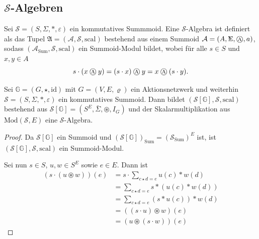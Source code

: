 \documentclass{article}
\DeclareMathOperator*{\Sigmacirc}{%
  \ThisStyle{\mathop{\ensurestackMath{\stackinset{c}{-0.75\LMpt}{c}{}{%
  \rotatebox[origin=lb]{-90}{$\circ$}}{\SavedStyle\Sigma}}}}}
\newcommand{\algebra}{\mathbin{
  \mathchoice
    {\mbox{\normalsize\textcircled{\scriptsize A}}}
    {\mbox{\normalsize\textcircled{\scriptsize A}}}
    {\mbox{\scriptsize\textcircled{\tiny A}}}
    {\mbox{\tiny\textcircled{\fontsize{3.5}{3.5}\selectfont A}}}
  }
}
\begin{document}
\subsection{$\mathcal{S}$-Algebren}

\begin{definition}
  Sei $\mathcal{S} = (S, \Sigma, \ast, \varepsilon)$ ein kommutatives Summmoid.
  Eine $\mathcal{S}$-Algebra ist definiert als das Tupel $\mathfrak{A} = (\mathcal{A}, \mathcal{S}, \text{scal})$
  bestehend aus einem Summoid $\mathcal{A} = (A, \Sigmacirc, \algebra, a)$,
  sodass $(\mathcal{A}_\text{Sum}, \mathcal{S}, \text{scal})$ ein Summoid-Modul bildet,
  wobei für alle $s \in S$ und $x, y \in A$
  \begin{equation*}
    s \cdot (x \algebra y) = (s \cdot x) \algebra y = x \algebra (s \cdot y).
  \end{equation*}
\end{definition}

\begin{theorem}
  Sei $\mathbb{G} = (G, \star, \text{id})$ mit $G = (V, E, \varrho)$ ein Aktionsnetzwerk
  und weiterhin $\mathcal{S} = (S, \Sigma, \ast, \varepsilon)$ ein kommutatives Summoid.
  Dann bildet $(\mathcal{S}[\mathbb{G}], \mathcal{S}, \text{scal})$
  bestehend aus $\mathcal{S}[\mathbb{G}] = (S^E, \bar\Sigma, \circledast, I_G)$
  und der Skalarmultiplikation aus $\text{Mod}(\mathcal{S}, E)$
  eine $\mathcal{S}$-Algebra.
\end{theorem}
\begin{proof}
  Da $\mathcal{S}[\mathbb{G}]$ ein Summoid
  und $(\mathcal{S}[\mathbb{G}])_\text{Sum} = (\mathcal{S}_\text{Sum})^E$ ist,
  ist $(\mathcal{S}[\mathbb{G}], \mathcal{S}, \text{scal})$ ein Summoid-Modul.

  Sei nun $s \in S$, $u, w \in S^E$ sowie $e \in E$.
  Dann ist
  \begin{align*}
    (s \cdot (u \circledast w))(e)
    &= s \cdot \sum_{c \star d = e} u(c) \ast w(d)\\
    &= \sum_{c \star d = e} s \ast (u(c) \ast w(d)) \\
    &= \sum_{c \star d = e} (s \ast u(c)) \ast w(d) \\
    &= ((s \cdot u) \circledast w)(e) \\
    &= (u \circledast (s \cdot w))(e)
  \end{align*}
\end{proof}
\end{document}

